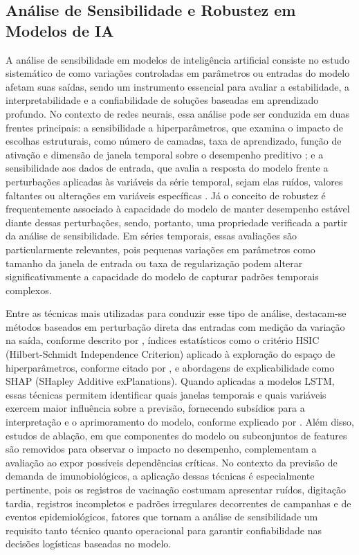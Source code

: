 \documentclass[
    12pt,                %
    openright,           %
    oneside,             %
    a4paper,             %
    english,             %
    brazil               %
]{abntex2}
\begin{document}
\subsection{Análise de Sensibilidade e Robustez em Modelos de IA}
\label{subsec:sensibilidade}

A análise de sensibilidade em modelos de inteligência artificial consiste no estudo sistemático de como variações controladas em parâmetros ou entradas do modelo afetam suas saídas, sendo um instrumento essencial para avaliar a estabilidade, a interpretabilidade e a confiabilidade de soluções baseadas em aprendizado profundo. No contexto de redes neurais, essa análise pode ser conduzida em duas frentes principais: a sensibilidade a hiperparâmetros, que examina o impacto de escolhas estruturais, como número de camadas, taxa de aprendizado, função de ativação e dimensão de janela temporal sobre o desempenho preditivo ; e a sensibilidade aos dados de entrada, que avalia a resposta do modelo frente a perturbações aplicadas às variáveis da série temporal, sejam elas ruídos, valores faltantes ou alterações em variáveis específicas . Já o conceito de robustez é frequentemente associado à capacidade do modelo de manter desempenho estável diante dessas perturbações, sendo, portanto, uma propriedade verificada a partir da análise de sensibilidade. Em séries temporais, essas avaliações são particularmente relevantes, pois pequenas variações em parâmetros como tamanho da janela de entrada ou taxa de regularização podem alterar significativamente a capacidade do modelo de capturar padrões temporais complexos.

Entre as técnicas mais utilizadas para conduzir esse tipo de análise, destacam-se métodos baseados em perturbação direta das entradas com medição da variação na saída, conforme descrito por , índices estatísticos como o critério HSIC (Hilbert-Schmidt Independence Criterion) aplicado à exploração do espaço de hiperparâmetros, conforme citado por , e abordagens de explicabilidade como SHAP (SHapley Additive exPlanations). Quando aplicadas a modelos LSTM, essas técnicas permitem identificar quais janelas temporais e quais variáveis exercem maior influência sobre a previsão, fornecendo subsídios para a interpretação e o aprimoramento do modelo, conforme explicado por . Além disso, estudos de ablação, em que componentes do modelo ou subconjuntos de features são removidos para observar o impacto no desempenho, complementam a avaliação ao expor possíveis dependências críticas. No contexto da previsão de demanda de imunobiológicos, a aplicação dessas técnicas é especialmente pertinente, pois os registros de vacinação costumam apresentar ruídos, digitação tardia, registros incompletos e padrões irregulares decorrentes de campanhas e de eventos epidemiológicos, fatores que tornam a análise de sensibilidade um requisito tanto técnico quanto operacional para garantir confiabilidade nas decisões logísticas baseadas no modelo.
\end{document}
